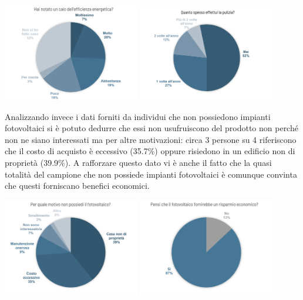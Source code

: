 \documentclass[a4paper, 12pt]{article}
\begin{document}
	\begin{center}
		\includegraphics[width=0.449\textwidth]{Images/effetti_efficienza.png}
		\includegraphics[width=0.449\textwidth]{Images/frequenza_pulizia.png}
	\end{center}
	Analizzando invece i dati forniti da individui che non possiedono impianti fotovoltaici si è potuto dedurre che essi non usufruiscono del prodotto non perché non ne siano interessati ma per altre motivazioni: circa 3 persone su 4 riferiscono che il costo di acquisto è eccessivo (35.7\%) oppure risiedono in un edificio non di proprietà (39.9\%). A rafforzare questo dato vi è anche il fatto che la quasi totalità del campione che non possiede impianti fotovoltaici è comunque convinta che questi forniscano benefici economici.
	\begin{center}
		\includegraphics[width=0.449\textwidth]{Images/no_pannelli.png}
		\includegraphics[width=0.449\textwidth]{Images/vantaggi_pannelli.png}
	\end{center}
\end{document}
